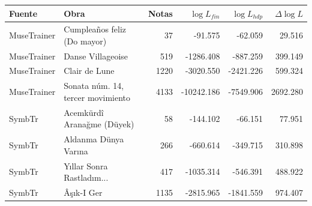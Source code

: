 \begin{tabular}{@{}p{1.7cm}p{4.6cm}rrrr@{}}
\hline
Fuente & Obra & Notas & $\log L_{fin}$ & $\log L_{hdp}$ & $\Delta \log L$ \\
\hline
MuseTrainer & Cumpleaños feliz (Do mayor) & 37 & -91.575 & -62.059 & 29.516 \\
MuseTrainer & Danse Villageoise & 519 & -1286.408 & -887.259 & 399.149 \\
MuseTrainer & Clair de Lune & 1220 & -3020.550 & -2421.226 & 599.324 \\
MuseTrainer & Sonata núm. 14, tercer movimiento & 4133 & -10242.186 & -7549.906 & 2692.280 \\
SymbTr & Acemkürdî Aranağme (Düyek) & 58 & -144.102 & -66.151 & 77.951 \\
SymbTr & Aldanma Dünya Varına & 266 & -660.614 & -349.715 & 310.898 \\
SymbTr & Yıllar Sonra Rastladım... & 417 & -1035.314 & -546.391 & 488.922 \\
SymbTr & Âşık-I Ger & 1135 & -2815.965 & -1841.559 & 974.407 \\
\hline
\end{tabular}
